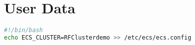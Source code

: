 \section{User Data} \label{user-data}
\begin{lstlisting}[language=bash]
#!/bin/bash	
echo ECS_CLUSTER=RFClusterdemo >> /etc/ecs/ecs.config	
\end{lstlisting}
